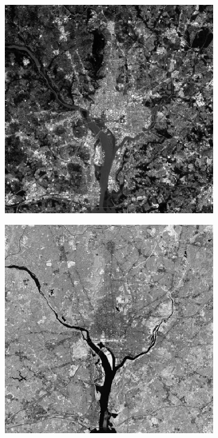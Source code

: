 \begin{figure}[h!]
\begin{subfigure}[b]{0.3\linewidth}
		\caption{}
		\label{fig:10reconstruct2}
	\end{subfigure}
	\begin{subfigure}[b]{0.3\linewidth}
		\includegraphics[width=\linewidth]{myfigure/p10/10_reconstruct_3.png}
		\caption{}
		\label{fig:10reconstruct3}
	\end{subfigure}
	\begin{subfigure}[b]{0.3\linewidth}
		\includegraphics[width=\linewidth]{myfigure/p10/10_reconstruct_4.png}

\end{subfigure}
\end{figure}
